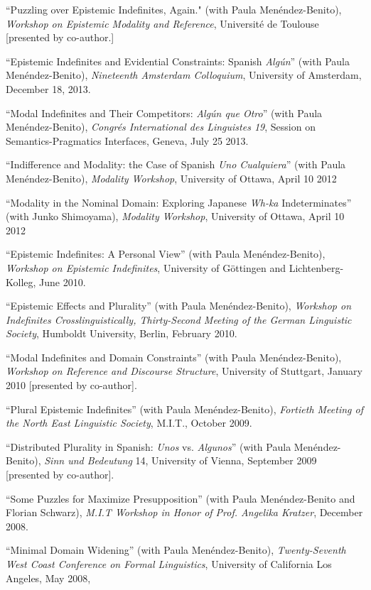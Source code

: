 \documentclass[11pt]{article}
\begin{document}
``Puzzling over Epistemic Indefinites, Again." (with Paula
Men\'endez-Benito), \textit{Workshop on Epistemic Modality and Reference}, Universit\'e de Toulouse [presented by co-author.]

``Epistemic Indefinites and Evidential Constraints:
Spanish \textit{Alg\'un}''  (with Paula
Men\'endez-Benito), \textit{Nineteenth Amsterdam Colloquium}, University of Amsterdam,
December 18, 2013.

``Modal Indefinites and Their Competitors: \textit{Alg\'un
  que Otro}'' (with Paula
Men\'endez-Benito), \textit{Congr\'es International des Linguistes 19},
Session on Semantics-Pragmatics Interfaces, Geneva, July 25 2013.

``Indifference and Modality: the Case of Spanish \textit{Uno
Cualquiera}'' (with Paula
Men\'endez-Benito), \textit{Modality Workshop}, University of Ottawa, April 10 2012

``Modality in the Nominal Domain: Exploring Japanese
\textit{Wh-ka} Indeterminates'' (with Junko Shimoyama), \textit{Modality Workshop}, University of Ottawa, April 10 2012

``Epistemic Indefinites: A Personal View'' (with Paula
Men\'endez-Benito), \textit{Workshop on Epistemic Indefinites},
University of G\"{o}ttingen and Lichtenberg-Kolleg, June 2010.

``Epistemic Effects and Plurality'' (with Paula
Men\'endez-Benito), \textit{Workshop on Indefinites
  Crosslinguistically, Thirty-Second Meeting of the German Linguistic Society},
Humboldt University, Berlin, February 2010.

``Modal Indefinites and Domain Constraints'' (with Paula
Men\'endez-Benito), \textit{Workshop on Reference and Discourse
  Structure}, University of Stuttgart, January 2010 [presented by co-author].

``Plural Epistemic Indefinites'' (with Paula Men\'endez-Benito), \textit{Fortieth
  Meeting of the North East Linguistic Society}, M.I.T., October 2009.

``Distributed Plurality in Spanish: \textit{Unos} vs. \textit{Algunos}''  (with Paula Men\'endez-Benito), \textit{Sinn und Bedeutung} 14, University of Vienna, September 2009 [presented by co-author].

``Some Puzzles for Maximize Presupposition'' (with
  Paula Men\'endez-Benito and Florian Schwarz), \textit{M.I.T Workshop in
  Honor of Prof. Angelika Kratzer}, December 2008.

``Minimal Domain Widening'' (with Paula Men\'endez-Benito), \textit{Twenty-Seventh West Coast Conference on
  Formal Linguistics}, University of California Los Angeles, May 2008, 
\end{document}
